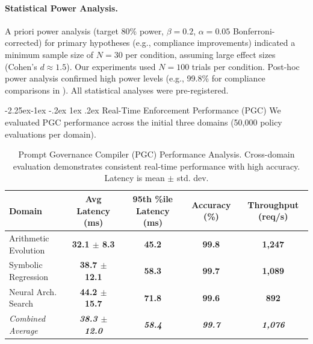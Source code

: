 \documentclass[manuscript,screen,review,anonymous,9pt]{acmart}
\makeatletter
\renewcommand\subsection{\@startsection{subsection}{2}{\z@}%
  {-2.25ex\@plus -1ex \@minus -.2ex}%
  {1ex \@plus .2ex}%
  {\normalfont\large\bfseries}}
\newcommand{\tablesize}{\footnotesize}
\newcommand{\tablenumfmt}[1]{\textbf{#1}}
\newcommand{\tableheader}[1]{\textbf{#1}}
\makeatother
\begin{document}
\paragraph{Statistical Power Analysis.}
\label{subsec:power_analysis}
A priori power analysis (target 80\% power, $\beta = 0.2$, $\alpha = 0.05$ Bonferroni-corrected) for primary hypotheses (e.g., compliance improvements) indicated a minimum sample size of $N=30$ per condition, assuming large effect sizes (Cohen's $d \approx 1.5$). Our experiments used $N=100$ trials per condition. Post-hoc power analysis confirmed high power levels (e.g., 99.8\% for compliance comparisons in ). All statistical analyses were pre-registered.

\subsection{Real-Time Enforcement Performance (PGC)}
\label{subsec:pgc_performance}
We evaluated PGC performance across the initial three domains (50,000 policy evaluations per domain).

\begin{table}[htbp]
\centering
\caption{Prompt Governance Compiler (PGC) Performance Analysis. Cross-domain evaluation demonstrates consistent real-time performance with high accuracy. Latency is mean $\pm$ std. dev.}
\label{tab:pgc_comprehensive}
\tablesize
\begin{tabular}{@{}lcccc@{}}
\toprule
\tableheader{Domain} & \tableheader{Avg Latency (ms)} & \tableheader{95th \%ile Latency (ms)} & \tableheader{Accuracy (\%)} & \tableheader{Throughput (req/s)} \\
\midrule
Arithmetic Evolution & \tablenumfmt{32.1 $\pm$ 8.3}   & \tablenumfmt{45.2}  & \tablenumfmt{99.8} & \tablenumfmt{1,247} \\
Symbolic Regression  & \tablenumfmt{38.7 $\pm$ 12.1}  & \tablenumfmt{58.3}  & \tablenumfmt{99.7} & \tablenumfmt{1,089} \\
Neural Arch. Search & \tablenumfmt{44.2 $\pm$ 15.7}  & \tablenumfmt{71.8}  & \tablenumfmt{99.6} & \tablenumfmt{892}   \\
\midrule
\textit{Combined Average} & \textit{\tablenumfmt{38.3 $\pm$ 12.0}} & \textit{\tablenumfmt{58.4}} & \textit{\tablenumfmt{99.7}} & \textit{\tablenumfmt{1,076}} \\
\bottomrule
\end{tabular}
\end{table}
\end{document}
